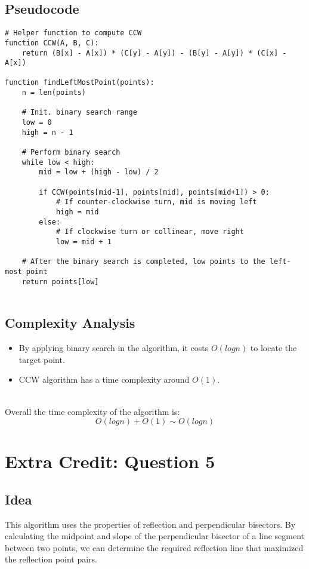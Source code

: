 \documentclass{article}
\begin{document}
\subsection*{Pseudocode}
\begin{verbatim}
# Helper function to compute CCW
function CCW(A, B, C):
    return (B[x] - A[x]) * (C[y] - A[y]) - (B[y] - A[y]) * (C[x] - A[x])

function findLeftMostPoint(points):
    n = len(points)

    # Init. binary search range
    low = 0
    high = n - 1

    # Perform binary search
    while low < high:
        mid = low + (high - low) / 2

        if CCW(points[mid-1], points[mid], points[mid+1]) > 0:
            # If counter-clockwise turn, mid is moving left
            high = mid
        else:
            # If clockwise turn or collinear, move right
            low = mid + 1

    # After the binary search is completed, low points to the left-most point
    return points[low]
  
\end{verbatim}

\subsection*{Complexity Analysis}
\begin{itemize}
    \item By applying binary search in the algorithm, it costs $O(logn)$ to locate the target point.
    \item CCW algorithm has a time complexity around $O(1)$.
\end{itemize}
\\
Overall the time complexity of the algorithm is:
\[ O(logn) + O(1) \sim O(logn) \]

\section*{Extra Credit: Question 5}

\subsection*{Idea}
This algorithm uses  the properties of reflection and perpendicular bisectors. By calculating the midpoint and slope of the perpendicular bisector of a line segment between two points, we can determine the required reflection line that maximized the reflection point pairs.
\end{document}
